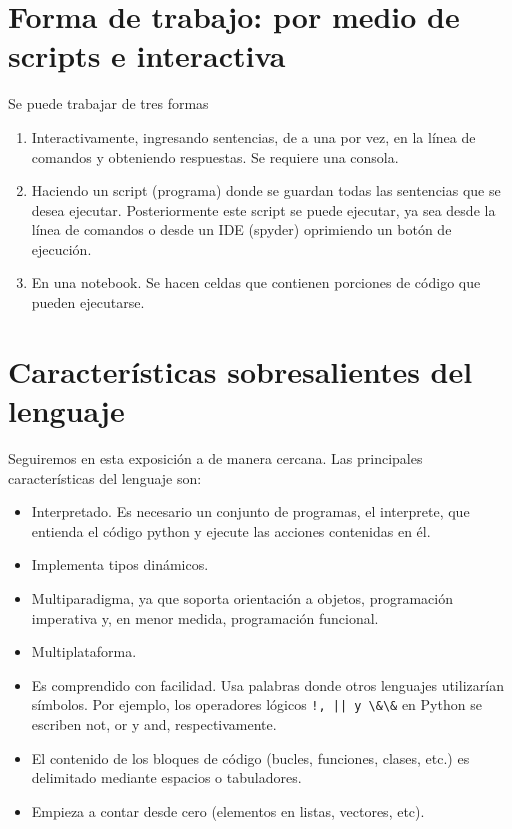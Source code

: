 \section{Forma de trabajo: por medio de scripts e interactiva}


Se puede trabajar de tres formas

\begin{enumerate}
\item Interactivamente, ingresando sentencias, de a una por vez, en la línea de comandos y obteniendo respuestas. Se requiere una consola.

\item Haciendo un script (programa) donde se guardan todas las sentencias que se desea ejecutar. Posteriormente este script se puede ejecutar, ya sea desde la línea de comandos o desde un IDE (spyder) oprimiendo un botón de ejecución.

\item En una notebook. Se hacen celdas que contienen porciones de código que pueden ejecutarse.

\end{enumerate}





\section{Características sobresalientes del lenguaje}

Seguiremos en esta exposición a \cite{wiki_python} de manera cercana. \link
Las principales características del lenguaje son:

\normalmarginpar
\begin{itemize}
\item Interpretado. Es necesario un conjunto de programas, 
el interprete, que entienda el código python y ejecute las acciones contenidas en él.
\item Implementa  tipos dinámicos.
\item  Multiparadigma, ya que soporta orientación a objetos, programación imperativa y, en menor medida, programación funcional.
\item Multiplataforma.

\item Es comprendido  con facilidad. Usa  palabras donde otros lenguajes utilizarían símbolos. Por ejemplo, los operadores lógicos \verb~!, || y \&\&~ en Python se escriben not, or y and, respectivamente.


\item  El contenido de los bloques de código (bucles, funciones, clases, etc.) es delimitado mediante espacios o tabuladores.

\item Empieza a contar desde cero (elementos en listas, vectores, etc).



\end{itemize}




